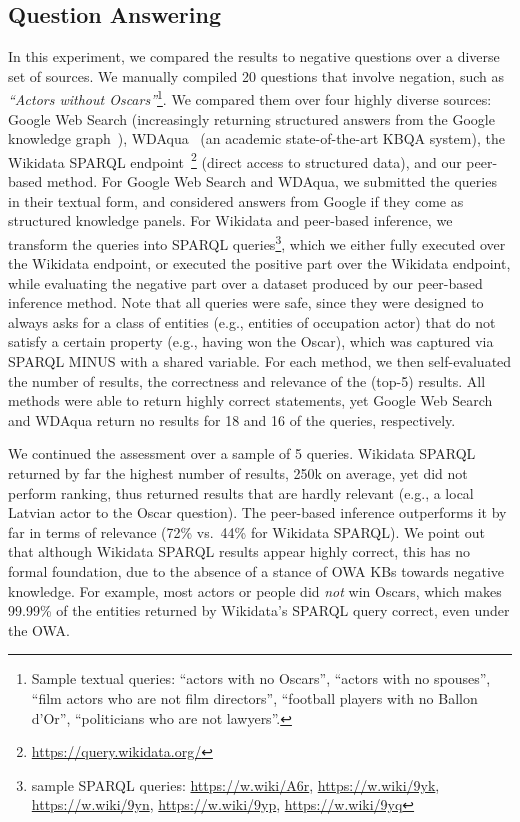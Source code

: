 \subsection{Question Answering}
In this experiment, we compared the results to negative questions over a diverse set of sources. We manually compiled 20 questions that involve negation, such as \emph{``Actors without Oscars''}\footnote{Sample textual queries: ``actors with no Oscars'', ``actors with no spouses'', ``film actors who are not film directors'', ``football players with no Ballon d'Or'', ``politicians who are not lawyers''.}. We compared them over four highly diverse sources: Google Web Search (increasingly returning structured answers from the Google knowledge graph~\cite{GKG}), WDAqua~\cite{Diefenbach2017} (an academic state-of-the-art KBQA system), the Wikidata SPARQL endpoint~\footnote{\url{https://query.wikidata.org/}} (direct access to structured data), and our peer-based method. For Google Web Search and WD\-Aqua, we submitted the queries in their textual form, and considered answers from Google if they come as structured knowledge panels. For Wikidata and peer-based inference, we transform the queries into SPARQL queries\footnote{sample SPARQL queries: \url{https://w.wiki/A6r}, \url{https://w.wiki/9yk}, \url{https://w.wiki/9yn}, \url{https://w.wiki/9yp}, \url{https://w.wiki/9yq}}, which we either fully executed over the Wikidata endpoint, or executed the positive part over the Wikidata endpoint, while evaluating the negative part over a dataset produced by our peer-based inference method. Note that all queries were safe, since they were designed to always asks for a class of entities (e.g., entities of occupation actor) that do not satisfy a certain property (e.g., having won the Oscar), which was captured via SPARQL MINUS with a shared variable. For each method, we then self-evaluated the number of results, the correctness and relevance of the (top-5) results. All methods were able to return highly correct statements, yet Google Web Search and WDAqua return no results for 18 and 16 of the queries, respectively.

We continued the assessment over a sample of 5 queries. Wikidata SPARQL returned by far the highest number of results, 250k on average, yet did not perform ranking, thus returned results that are hardly relevant (e.g., a local Latvian actor to the Oscar question). The peer-based inference outperforms it by far in terms of relevance (72\% vs.\ 44\% for Wikidata SPARQL). We point out that although Wikidata SPARQL results appear highly correct, this has no formal foundation, due to the absence of a stance of OWA KBs towards negative knowledge. For example, most actors or people did \textit{not} win Oscars, which makes 99.99\% of the entities returned by Wikidata's SPARQL query correct, even under the OWA.

